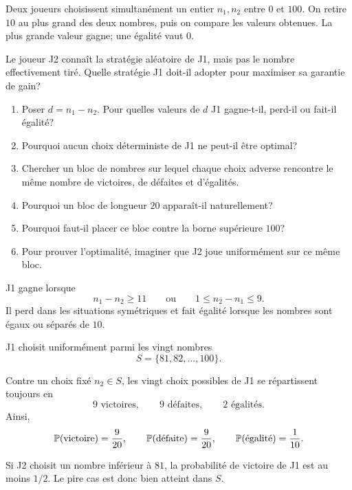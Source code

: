 \documentclass[11pt,a4paper]{article}
\begin{document}

\begin{statementbox}
Deux joueurs choisissent simultanément un entier $n_1,n_2$ entre $0$ et
$100$. On retire $10$ au plus grand des deux nombres, puis on compare les
valeurs obtenues. La plus grande valeur gagne; une égalité vaut $0$.

Le joueur J2 connaît la stratégie aléatoire de J1, mais pas le nombre
effectivement tiré. Quelle stratégie J1 doit-il adopter pour maximiser sa
garantie de gain?
\end{statementbox}

\begin{hintsbox}
\begin{enumerate}
  \item Poser $d=n_1-n_2$. Pour quelles valeurs de $d$ J1 gagne-t-il, perd-il
  ou fait-il égalité?
  \item Pourquoi aucun choix déterministe de J1 ne peut-il être optimal?
  \item Chercher un bloc de nombres sur lequel chaque choix adverse rencontre
  le même nombre de victoires, de défaites et d'égalités.
  \item Pourquoi un bloc de longueur $20$ apparaît-il naturellement?
  \item Pourquoi faut-il placer ce bloc contre la borne supérieure $100$?
  \item Pour prouver l'optimalité, imaginer que J2 joue uniformément sur ce
  même bloc.
\end{enumerate}
\end{hintsbox}

\correction

J1 gagne lorsque
\[
n_1-n_2\geq 11
\qquad\text{ou}\qquad
1\leq n_2-n_1\leq 9.
\]
Il perd dans les situations symétriques et fait égalité lorsque les nombres
sont égaux ou séparés de $10$.

\begin{keyideabox}
J1 choisit uniformément parmi les vingt nombres
\[
S=\{81,82,\ldots,100\}.
\]
\end{keyideabox}

Contre un choix fixé $n_2\in S$, les vingt choix possibles de J1 se
répartissent toujours en
\[
9\text{ victoires},\qquad 9\text{ défaites},\qquad 2\text{ égalités}.
\]
Ainsi,
\[
\mathbb P(\text{victoire})=\frac9{20},\qquad
\mathbb P(\text{défaite})=\frac9{20},\qquad
\mathbb P(\text{égalité})=\frac1{10}.
\]

Si J2 choisit un nombre inférieur à $81$, la probabilité de victoire de J1
est au moins $1/2$. Le pire cas est donc bien atteint dans $S$.
\end{document}
